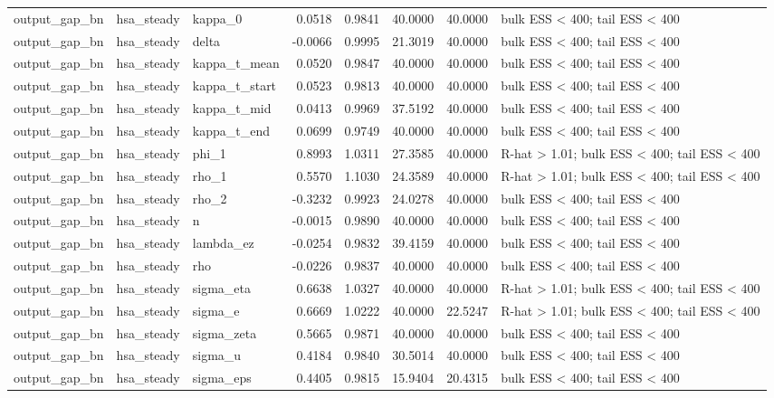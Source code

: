 \begin{tabular}{lllrrrrl}
output\_gap\_bn & hsa\_steady & kappa\_0 & 0.0518 & 0.9841 & 40.0000 & 40.0000 & bulk ESS < 400; tail ESS < 400 \\
output\_gap\_bn & hsa\_steady & delta & -0.0066 & 0.9995 & 21.3019 & 40.0000 & bulk ESS < 400; tail ESS < 400 \\
output\_gap\_bn & hsa\_steady & kappa\_t\_mean & 0.0520 & 0.9847 & 40.0000 & 40.0000 & bulk ESS < 400; tail ESS < 400 \\
output\_gap\_bn & hsa\_steady & kappa\_t\_start & 0.0523 & 0.9813 & 40.0000 & 40.0000 & bulk ESS < 400; tail ESS < 400 \\
output\_gap\_bn & hsa\_steady & kappa\_t\_mid & 0.0413 & 0.9969 & 37.5192 & 40.0000 & bulk ESS < 400; tail ESS < 400 \\
output\_gap\_bn & hsa\_steady & kappa\_t\_end & 0.0699 & 0.9749 & 40.0000 & 40.0000 & bulk ESS < 400; tail ESS < 400 \\
output\_gap\_bn & hsa\_steady & phi\_1 & 0.8993 & 1.0311 & 27.3585 & 40.0000 & R-hat > 1.01; bulk ESS < 400; tail ESS < 400 \\
output\_gap\_bn & hsa\_steady & rho\_1 & 0.5570 & 1.1030 & 24.3589 & 40.0000 & R-hat > 1.01; bulk ESS < 400; tail ESS < 400 \\
output\_gap\_bn & hsa\_steady & rho\_2 & -0.3232 & 0.9923 & 24.0278 & 40.0000 & bulk ESS < 400; tail ESS < 400 \\
output\_gap\_bn & hsa\_steady & n & -0.0015 & 0.9890 & 40.0000 & 40.0000 & bulk ESS < 400; tail ESS < 400 \\
output\_gap\_bn & hsa\_steady & lambda\_ez & -0.0254 & 0.9832 & 39.4159 & 40.0000 & bulk ESS < 400; tail ESS < 400 \\
output\_gap\_bn & hsa\_steady & rho & -0.0226 & 0.9837 & 40.0000 & 40.0000 & bulk ESS < 400; tail ESS < 400 \\
output\_gap\_bn & hsa\_steady & sigma\_eta & 0.6638 & 1.0327 & 40.0000 & 40.0000 & R-hat > 1.01; bulk ESS < 400; tail ESS < 400 \\
output\_gap\_bn & hsa\_steady & sigma\_e & 0.6669 & 1.0222 & 40.0000 & 22.5247 & R-hat > 1.01; bulk ESS < 400; tail ESS < 400 \\
output\_gap\_bn & hsa\_steady & sigma\_zeta & 0.5665 & 0.9871 & 40.0000 & 40.0000 & bulk ESS < 400; tail ESS < 400 \\
output\_gap\_bn & hsa\_steady & sigma\_u & 0.4184 & 0.9840 & 30.5014 & 40.0000 & bulk ESS < 400; tail ESS < 400 \\
output\_gap\_bn & hsa\_steady & sigma\_eps & 0.4405 & 0.9815 & 15.9404 & 20.4315 & bulk ESS < 400; tail ESS < 400 \\

\end{tabular}
